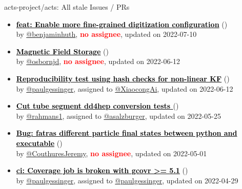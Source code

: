 \begin{frame}[allowframebreaks]{ acts-project/acts: All stale Issues / PRs}
\begin{itemize}
    \item\propen\prwip\prstale\textbf{\href{https://github.com/acts-project/acts/pull/1272}{\textcolor{black}{feat: Enable more fine-grained digitization configuration}}}
    (\href{https://github.com/acts-project/acts/pull/1272}{}) \\
    by \href{https://github.com/benjaminhuth}{@benjaminhuth}, {}\textbf{\textcolor{Red}{no assignee}}, updated on 2022-07-10

    \item\iss\prstale\textbf{\href{https://github.com/acts-project/acts/issues/1239}{\textcolor{black}{Magnetic Field Storage}}}
    (\href{https://github.com/acts-project/acts/issues/1239}{}) \\
    by \href{https://github.com/osbornjd}{@osbornjd}, {}\textbf{\textcolor{Red}{no assignee}}, updated on 2022-06-12

    \item\iss\prstale\textbf{\href{https://github.com/acts-project/acts/issues/1246}{\textcolor{black}{Reproducibility test using hash checks for non-linear KF}}}
    (\href{https://github.com/acts-project/acts/issues/1246}{}) \\
    by \href{https://github.com/paulgessinger}{@paulgessinger}, {}assigned to \href{https://github.com/XiaocongAi}{@XiaocongAi}, updated on 2022-06-12

    \item\iss\prstale\textbf{\href{https://github.com/acts-project/acts/issues/1146}{\textcolor{black}{Cut tube segment dd4hep conversion tests }}}
    (\href{https://github.com/acts-project/acts/issues/1146}{}) \\
    by \href{https://github.com/rahmans1}{@rahmans1}, {}assigned to \href{https://github.com/asalzburger}{@asalzburger}, updated on 2022-05-25

    \item\iss\prstale\textbf{\href{https://github.com/acts-project/acts/issues/1221}{\textcolor{black}{Bug: fatras different particle final states between python and executable}}}
    (\href{https://github.com/acts-project/acts/issues/1221}{}) \\
    by \href{https://github.com/CouthuresJeremy}{@CouthuresJeremy}, {}\textbf{\textcolor{Red}{no assignee}}, updated on 2022-05-01

    \item\iss\prstale\textbf{\href{https://github.com/acts-project/acts/issues/1211}{\textcolor{black}{ci: Coverage job is broken with gcovr \textgreater{}= 5.1}}}
    (\href{https://github.com/acts-project/acts/issues/1211}{}) \\
    by \href{https://github.com/paulgessinger}{@paulgessinger}, {}assigned to \href{https://github.com/paulgessinger}{@paulgessinger}, updated on 2022-04-29


\end{itemize}
\end{frame}
